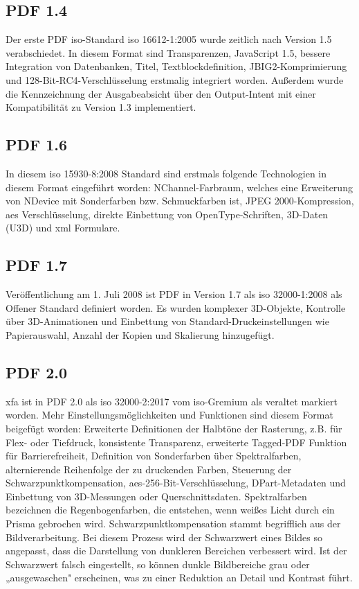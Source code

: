 \subsection{PDF 1.4}
Der erste PDF \gls{iso}-Standard \gls{iso} 16612-1:2005 wurde zeitlich nach Version 1.5 verabschiedet. In diesem Format sind Transparenzen, JavaScript 1.5, bessere Integration von Datenbanken, Titel, Textblockdefinition, JBIG2-Komprimierung und 128-Bit-RC4-Verschlüsselung erstmalig integriert worden. \cite{proj-consult} Außerdem wurde die Kennzeichnung der Ausgabeabsicht über den Output-Intent mit einer Kompatibilität zu Version 1.3 implementiert. \cite{schneeberger}

\subsection{PDF 1.6}
In diesem \gls{iso} 15930-8:2008 Standard sind erstmals folgende Technologien in diesem Format eingeführt worden: NChannel-Farbraum, welches eine Erweiterung von NDevice mit Sonderfarben bzw. Schmuckfarben ist, JPEG 2000-Kompression, \gls{aes} Verschlüsselung, direkte Einbettung von OpenType-Schriften, 3D-Daten (U3D) und \gls{xml} Formulare. \cite{proj-consult}

\subsection{PDF 1.7}
Veröffentlichung am 1. Juli 2008 ist PDF in Version 1.7 als \gls{iso} 32000-1:2008 als Offener Standard definiert worden. Es wurden komplexer 3D-Objekte, Kontrolle über 3D-Animationen und Einbettung von Standard-Druckeinstellungen wie Papierauswahl, Anzahl der Kopien und Skalierung hinzugefügt.
\cite{proj-consult}

\subsection{PDF 2.0}
\gls{xfa} ist in PDF 2.0 als \gls{iso} 32000-2:2017 vom \gls{iso}-Gremium als veraltet markiert worden. Mehr Einstellungsmöglichkeiten und Funktionen sind diesem Format beigefügt worden: Erweiterte Definitionen der Halbtöne der Rasterung, z.B. für Flex- oder Tiefdruck, konsistente Transparenz, erweiterte Tagged-PDF Funktion für Barrierefreiheit, Definition von Sonderfarben über Spektralfarben, alternierende Reihenfolge der zu druckenden Farben, Steuerung der Schwarzpunktkompensation, \gls{aes}-256-Bit-Verschlüsselung, DPart-Metadaten und Einbettung von 3D-Messungen oder Querschnittsdaten. \cite{proj-consult}
Spektralfarben bezeichnen die Regenbogenfarben, die entstehen, wenn weißes Licht durch ein Prisma gebrochen wird. Schwarzpunktkompensation stammt begrifflich aus der Bildverarbeitung. Bei diesem Prozess wird der Schwarzwert eines Bildes so angepasst, dass die Darstellung von dunkleren Bereichen verbessert wird. Ist der Schwarzwert falsch eingestellt, so können dunkle Bildbereiche grau oder „ausgewaschen" erscheinen, was zu einer Reduktion an Detail und Kontrast führt. \cite{schwarz}